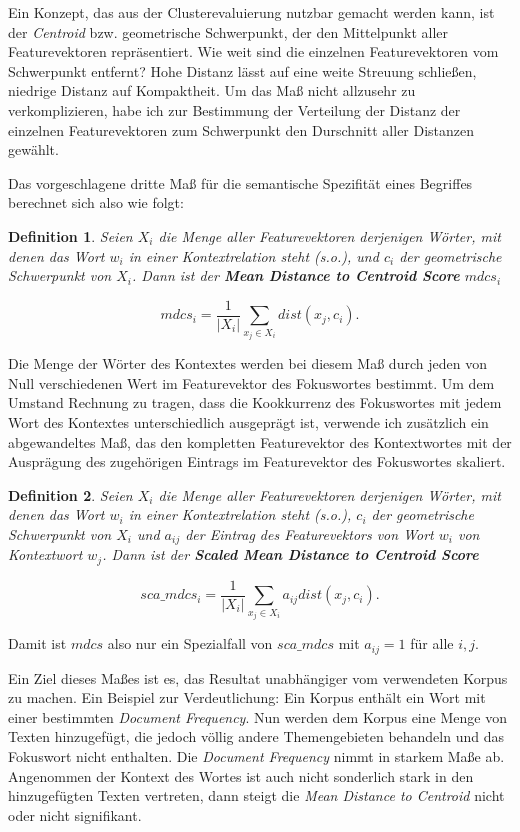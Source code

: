 \documentclass[11pt,numbers=noenddot]{scrartcl}
\newtheorem*{defi}{Definition}
\begin{document}
Ein Konzept, das aus der Clusterevaluierung nutzbar gemacht werden kann, ist der \emph{Centroid} bzw. geometrische Schwerpunkt, der den Mittelpunkt aller Featurevektoren repräsentiert. Wie weit sind die einzelnen Featurevektoren vom Schwerpunkt entfernt? Hohe Distanz lässt auf eine weite Streuung schließen, niedrige Distanz auf Kompaktheit. Um das Maß nicht allzusehr zu verkomplizieren, habe ich zur Bestimmung der Verteilung der Distanz der einzelnen Featurevektoren zum Schwerpunkt den Durschnitt aller Distanzen gewählt.

Das vorgeschlagene dritte Maß für die semantische Spezifität eines Begriffes berechnet sich also wie folgt:

\begin{defi}
Seien $X_i$ die Menge aller Featurevektoren derjenigen Wörter, mit denen das Wort $w_i$ in einer Kontextrelation steht (s.o.), und $c_i$ der geometrische Schwerpunkt von $X_i$. Dann ist der \textbf{Mean Distance to Centroid Score} $mdcs_i$

\begin{equation}
   mdcs_i =  \frac{1}{|X_i|} \sum_{x_j \in X_i} dist(x_j, c_i).
\end{equation}
\end{defi}

Die Menge der Wörter des Kontextes werden bei diesem Maß durch jeden von Null verschiedenen Wert im Featurevektor des Fokuswortes bestimmt. Um dem Umstand Rechnung zu tragen, dass die Kookkurrenz des Fokuswortes mit jedem Wort des Kontextes unterschiedlich ausgeprägt ist, verwende ich zusätzlich ein abgewandeltes Maß, das den kompletten Featurevektor des Kontextwortes mit der Ausprägung des zugehörigen Eintrags im Featurevektor des Fokuswortes skaliert.

\begin{defi}
Seien $X_i$ die Menge aller Featurevektoren derjenigen Wörter, mit denen das Wort $w_i$ in einer Kontextrelation steht (s.o.), $c_i$ der geometrische Schwerpunkt von $X_i$ und $a_{ij}$ der Eintrag des Featurevektors von Wort $w_i$ von Kontextwort $w_j$. Dann ist der \textbf{Scaled Mean Distance to Centroid Score}

$$
  sca\_mdcs_i =  \frac{1}{|X_i|} \sum_{x_j \in X_i}  a_{ij} dist(x_j, c_i).
$$

\end{defi}

Damit ist $mdcs$ also nur ein Spezialfall von $sca\_mdcs$ mit $a_{ij} = 1$ für alle $i,j$.

Ein Ziel dieses Maßes ist es, das Resultat unabhängiger vom verwendeten Korpus zu machen. Ein Beispiel zur Verdeutlichung: Ein Korpus enthält ein Wort mit einer bestimmten \emph{Document Frequency}. Nun werden dem Korpus eine Menge von Texten hinzugefügt, die jedoch völlig andere Themengebieten behandeln und das Fokuswort nicht enthalten. Die \emph{Document Frequency} nimmt in starkem Maße ab. Angenommen der Kontext des Wortes ist auch nicht sonderlich stark in den hinzugefügten Texten vertreten, dann steigt die \emph{Mean Distance to Centroid} nicht oder nicht signifikant.
\end{document}
